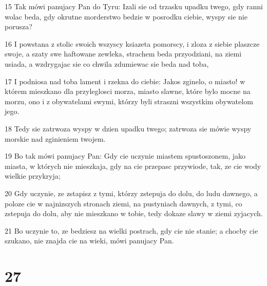 \par 15 Tak mówi panujacy Pan do Tyru: Izali sie od trzasku upadku twego, gdy ranni wolac beda, gdy okrutne morderstwo bedzie w posrodku ciebie, wyspy sie nie porusza?
\par 16 I powstana z stolic swoich wszyscy ksiazeta pomorscy, i zloza z siebie plaszcze swoje, a szaty swe haftowane zewleka, strachem beda przyodziani, na ziemi usiada, a wzdrygajac sie co chwila zdumiewac sie beda nad toba,
\par 17 I podniosa nad toba lament i rzekna do ciebie: Jakos zginelo, o miasto! w którem mieszkano dla przyleglosci morza, miasto slawne, które bylo mocne na morzu, ono i z obywatelami swymi, którzy byli straszni wszystkim obywatelom jego.
\par 18 Tedy sie zatrwoza wyspy w dzien upadku twego; zatrwoza sie mówie wyspy morskie nad zginieniem twojem.
\par 19 Bo tak mówi panujacy Pan: Gdy cie uczynie miastem spustoszonem, jako miasta, w których nie mieszkaja, gdy na cie przepasc przywiode, tak, ze cie wody wielkie przykryja;
\par 20 Gdy uczynie, ze zstapisz z tymi, którzy zstepuja do dolu, do ludu dawnego, a poloze cie w najnizszych stronach ziemi, na pustyniach dawnych, z tymi, co zstepuja do dolu, aby nie mieszkano w tobie, tedy dokaze slawy w ziemi zyjacych.
\par 21 Bo uczynie to, ze bedziesz na wielki postrach, gdy cie nie stanie; a chocby cie szukano, nie znajda cie na wieki, mówi panujacy Pan.

\chapter{27}

